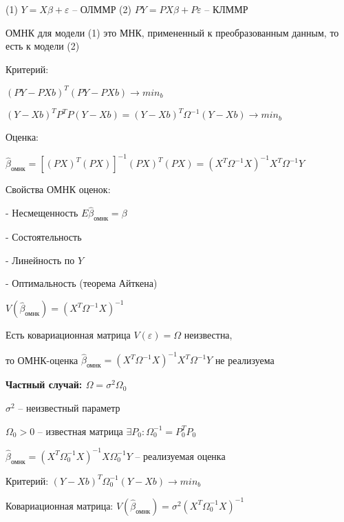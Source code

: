\documentclass{article}
\begin{document}
(1) $Y = X\beta + \varepsilon$ -- ОЛММР
(2) $PY = PX\beta + P\varepsilon$ -- КЛММР

ОМНК для модели (1) это МНК, примененный к преобразованным данным, то есть к модели (2)\par

\vspace{1mm}
Критерий:\par
$(PY-PXb)^T(PY-PXb) \longrightarrow min_b$\par
$(Y-Xb)^TP^TP(Y-Xb) = (Y-Xb)^T\Omega^{-1}(Y-Xb) \longrightarrow min_b$ \par

\vspace{2mm}
Оценка:\par
$\hat{\beta}_{\text{омнк}} = [(PX)^T(PX)]^{-1}(PX)^T(PX) = (X^T \Omega^{-1} X)^{-1} X^T \Omega^{-1} Y$\par

\vspace{2mm}
Свойства ОМНК оценок:\par
- Несмещенность $E\hat{\beta}_{\text{омнк}} = \beta$\par
- Состоятельность\par
- Линейность по $Y$\par
- Оптимальность (теорема Айткена)\par

\vspace{2mm}
$V(\hat{\beta}_{\text{омнк}}) = (X^T\Omega^{-1}X)^{-1}$\par

\vspace{2mm}
Есть ковариационная матрица $V(\varepsilon) = \Omega$
неизвестна, \par 
то ОМНК-оценка $\hat{\beta}_{\text{омнк}} = (X^T\Omega^{-1}X)^{-1}X^T\Omega^{-1}Y$ не реализуема

\vspace{2mm}
\textbf{Частный случай: $\Omega = \sigma^2 \Omega_0$}\par
$\sigma^2$ -- неизвестный параметр\par
$\Omega_0 > 0$ -- известная матрица $\exists P_0: \Omega_0^{-1} = P_0^TP_0$\par
 
$\hat{\beta}_{\text{омнк}} = (X^T\Omega_0^{-1}X)^{-1}X\Omega_0^{-1}Y$ -- реализуемая оценка\par

\vspace{2mm}
Критерий: $(Y - Xb)^T\Omega_0^{-1}(Y - Xb) \longrightarrow min_b$\par
Ковариационная матрица: $V(\hat{\beta}_{\text{омнк}}) = \sigma^2(X^T\Omega_0^{-1}X)^{-1}$
\end{document}
